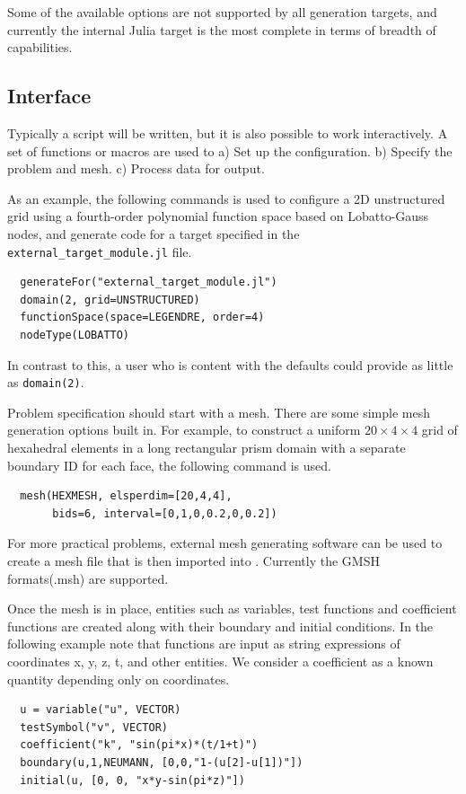 \documentclass[twoside,leqno,twocolumn]{article}
\begin{document}
Some of the available options are not supported by all generation targets, and currently the internal Julia target is the most complete in terms of breadth of capabilities. 

\subsection{Interface}
Typically a script will be written, but it is also possible to work interactively. A set of functions or macros are used to a) Set up the configuration. b) Specify the problem and mesh. c) Process data for output.

As an example, the following commands is used to configure a 2D unstructured grid using a fourth-order polynomial function space based on Lobatto-Gauss nodes, and generate code for a target specified in the \texttt{external\_target\_module.jl} file.
\begin{verbatim}
  generateFor("external_target_module.jl")
  domain(2, grid=UNSTRUCTURED)
  functionSpace(space=LEGENDRE, order=4)
  nodeType(LOBATTO)
\end{verbatim}
In contrast to this, a user who is content with the defaults could provide as little as \texttt{domain(2)}.

Problem specification should start with a mesh. There are some simple mesh generation options built in. For example, to construct a uniform $20\times 4\times 4$ grid of hexahedral elements in a long rectangular prism domain with a separate boundary ID for each face, the following command is used.
\begin{verbatim}
  mesh(HEXMESH, elsperdim=[20,4,4], 
       bids=6, interval=[0,1,0,0.2,0,0.2])
\end{verbatim}
For more practical problems, external mesh generating software can be used to create a mesh file that is then imported into \FMshop. Currently the GMSH formats(.msh) are supported.

Once the mesh is in place, entities such as variables, test functions and coefficient functions are created along with their boundary and initial conditions. In the following example note that functions are input as string expressions of coordinates x, y, z, t, and other entities. We consider a coefficient as a known quantity depending only on coordinates.
\begin{verbatim}
  u = variable("u", VECTOR)
  testSymbol("v", VECTOR)
  coefficient("k", "sin(pi*x)*(t/1+t)")
  boundary(u,1,NEUMANN, [0,0,"1-(u[2]-u[1])"])
  initial(u, [0, 0, "x*y-sin(pi*z)"])
\end{verbatim}
\end{document}
